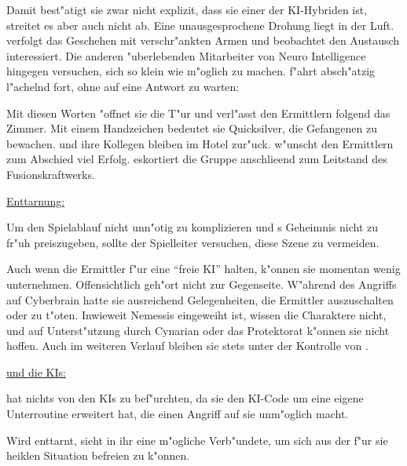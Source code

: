 
Damit best"atigt sie zwar nicht explizit, dass sie einer der KI-Hybriden ist, streitet es aber auch nicht ab. Eine unausgesprochene Drohung liegt in der Luft. \ml{} verfolgt das Geschehen mit verschr"ankten Armen und beobachtet den Austausch interessiert. Die anderen "uberlebenden Mitarbeiter von Neuro Intelligence hingegen versuchen, sich so klein wie m"oglich zu machen. \xl{} f"ahrt absch"atzig l"achelnd fort, ohne auf eine Antwort zu warten:


Mit diesen Worten "offnet sie die T"ur und verl"asst den Ermittlern folgend das Zimmer. Mit einem Handzeichen bedeutet sie Quicksilver, die Gefangenen zu bewachen. \ml{} und ihre Kollegen bleiben im Hotel zur"uck. \ml{} w"unscht den Ermittlern zum Abschied viel Erfolg. \xl{} eskortiert die Gruppe anschlie\3end zum Leitstand des Fusionskraftwerks.
\vfill

\begin{remarks}
	\underline{Enttarnung:}

	Um den Spielablauf nicht unn"otig zu komplizieren und \xl{}s Geheimnis nicht zu fr"uh preiszugeben, sollte der Spielleiter versuchen, diese Szene zu vermeiden.

	Auch wenn die Ermittler \xl{} f"ur eine ``freie KI'' halten, k"onnen sie momentan wenig unternehmen. Offensichtlich geh"ort \xl{} nicht zur Gegenseite. W"ahrend des Angriffs auf Cyberbrain hatte sie ausreichend Gelegenheiten, die Ermittler auszuschalten oder \ml{} zu t"oten. Inwieweit Nemessis eingeweiht ist, wissen die Charaktere nicht, und auf Unterst"utzung durch Cynarian oder das Protektorat k"onnen sie nicht hoffen. Auch im weiteren Verlauf bleiben sie stets unter der Kontrolle von \xl{}.	
\end{remarks}

\begin{remarks}	
	\underline{\ml{} und die KIs:}

	\ml{} hat nichts von den KIs zu bef"urchten, da sie den KI-Code um eine eigene Unterroutine erweitert hat, die einen Angriff auf sie unm"oglich macht.

	Wird \xl{} enttarnt, sieht \ml{} in ihr eine m"ogliche Verb"undete, um sich aus der f"ur sie heiklen Situation befreien zu k"onnen.
\end{remarks}
